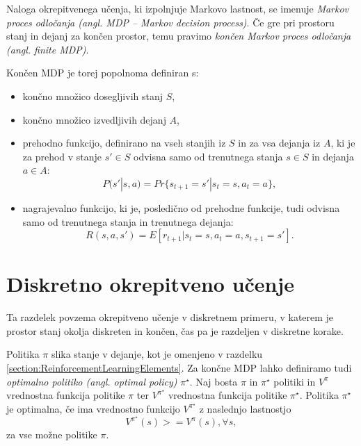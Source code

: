 \documentclass[a4paper, oneside, 12pt]{report}
\begin{document}
Naloga okrepitvenega učenja, ki izpolnjuje Markovo lastnost, se imenuje {\em Markov proces odločanja (angl. MDP -- Markov decision process)}. Če gre pri prostoru stanj in dejanj za končen prostor, temu pravimo {\em končen Markov proces odločanja (angl. finite MDP)}.

Končen MDP je torej popolnoma definiran s:
\begin{itemize}
\item končno množico dosegljivih stanj $S$,
\item končno množico izvedljivih dejanj $A$,
\item prehodno funkcijo, definirano na vseh stanjih iz $S$ in za vsa dejanja iz $A$, ki je za prehod v stanje $s' \in S$ odvisna samo od trenutnega stanja $s \in S$ in dejanja $a \in A$: 
\begin{equation}
P(s' | s, a) = Pr\{s_{t+1} = s' | s_t = s, a_t = a\},
\end{equation}
\item nagrajevalno funkcijo, ki je, posledično od prehodne funkcije, tudi odvisna samo od trenutnega stanja in trenutnega dejanja:
\begin{equation}
R(s, a, s') = E[r_{t+1} | s_t = s, a_t = a, s_{t+1} = s'].
\end{equation}
\end{itemize}

\section{Diskretno okrepitveno učenje}
Ta razdelek povzema okrepitveno učenje \cite{ReinforcementLearningAnIntroduction} v diskretnem primeru, v katerem je prostor stanj okolja diskreten in končen, čas pa je razdeljen v diskretne korake.

Politika $\pi$ slika stanje v dejanje, kot je omenjeno v razdelku \ref{section:ReinforcementLearningElements}. Za končne MDP lahko definiramo tudi {\em optimalno politiko (angl. optimal policy)} $\pi^\star$. Naj bosta $\pi$ in $\pi^\star$ politiki in $V^\pi$ vrednostna funkcija politike $\pi$ ter $V^{\pi^\star}$ vrednostna funkcija politike $\pi^\star$. Politika $\pi^\star$ je optimalna, če ima vrednostno funkcijo  $V^{\pi^\star}$ z naslednjo lastnostjo
\begin{equation}
V^{\pi^\star}(s) >= V^\pi(s), \forall s,
\end{equation}
za vse možne politike $\pi$.
\end{document}
